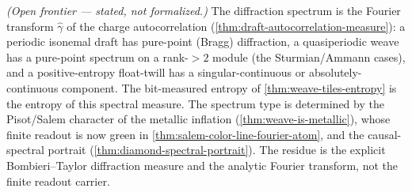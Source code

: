 \begin{theorem}\label{thm:draft-diffraction-spectrum}\notready{}
\emph{(Open frontier --- stated, not formalized.)} The diffraction spectrum is
the Fourier transform $\widehat{\gamma}$ of the charge autocorrelation
(\cref{thm:draft-autocorrelation-measure}): a periodic isonemal draft has pure-point
(Bragg) diffraction, a quasiperiodic weave has a pure-point spectrum on a rank-$>2$ module
(the Sturmian/Ammann cases), and a positive-entropy float-twill has a singular-continuous
or absolutely-continuous component. The bit-measured entropy of
\cref{thm:weave-tiles-entropy} is the entropy of this spectral measure.  The
spectrum type is determined by the Pisot/Salem character of the metallic
inflation (\cref{thm:weave-is-metallic}), whose finite readout is now green in
\cref{thm:salem-color-line-fourier-atom}, and the causal-spectral portrait
(\cref{thm:diamond-spectral-portrait}).  The residue is the explicit
Bombieri--Taylor diffraction measure and the analytic Fourier transform, not
the finite readout carrier.
\end{theorem}
